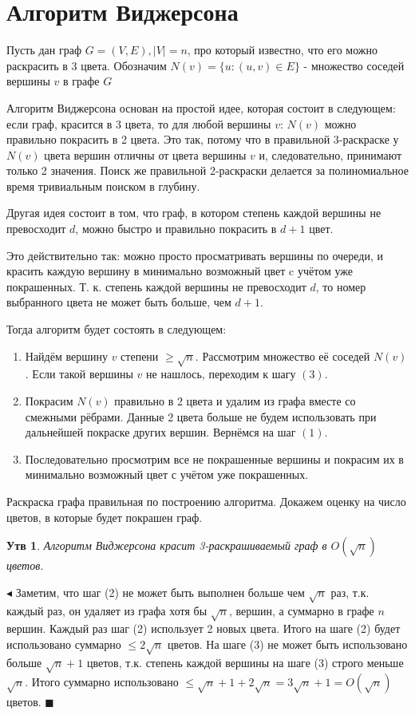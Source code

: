 \documentclass{article}
\newtheorem*{statement}{Утв}
\begin{document}
\section{Алгоритм Виджерсона}

Пусть дан граф $G=(V, E), |V| = n$,  про который известно, что его можно раскрасить в 3 цвета. Обозначим $N(v) = \{u: (u, v) \in E \} $ - множество соседей вершины $v$ в графе $G$

Алгоритм Виджерсона основан на простой идее, которая состоит в следующем: 
если граф, красится в 3 цвета, то для любой вершины $v$: $N(v)$ можно правильно покрасить в 2 цвета.
Это так, потому что в правильной 3-раскраске у $N(v)$ цвета вершин отличны от цвета вершины $v$ и, следовательно, принимают только 2 значения. Поиск же правильной 2-раскраски делается за полиномиальное время тривиальным поиском в глубину.

Другая идея состоит в том, что граф, в котором степень каждой вершины не превосходит $d$, можно быстро и правильно покрасить в $d + 1$ цвет.

Это действительно так: можно просто просматривать вершины по очереди, и красить каждую вершину в минимально возможный цвет c учётом уже покрашенных. Т. к. степень каждой вершины не превосходит $d$, то номер выбранного цвета не может быть больше, чем $d + 1$.

Тогда алгоритм будет состоять в следующем:
\begin{enumerate}
\item Найдём вершину $v$ степени $\ge \sqrt{n}$. Рассмотрим множество её соседей $N(v)$. Если такой вершины $v$ не нашлось, переходим к шагу $(3)$.
\item Покрасим $N(v)$ правильно в 2 цвета и удалим из графа вместе со смежными рёбрами. Данные 2 цвета больше не будем использовать при дальнейшей покраске других вершин. Вернёмся на шаг $(1)$.
\item Последовательно просмотрим все не покрашенные вершины и покрасим их в минимально возможный цвет с учётом уже покрашенных.
\end{enumerate}

Раскраска графа правильная по построению алгоритма. Докажем оценку на число цветов, в которые будет покрашен граф.
\begin{statement}
Алгоритм Виджерсона красит 3-раскрашиваемый граф в $O(\sqrt{n})$ цветов.
\end{statement}

$\blacktriangleleft$
Заметим, что шаг (2) не может быть выполнен больше чем $\sqrt{n}$ раз, т.к. каждый раз, он удаляет из графа хотя бы $\sqrt{n}$, вершин, а суммарно в графе $n$ вершин.
Каждый раз шаг (2) использует 2 новых цвета. Итого на шаге (2) будет использовано суммарно $\le 2\sqrt{n}$ цветов.
На шаге (3) не может быть использовано больше $\sqrt{n} + 1$ цветов, т.к. степень каждой вершины на шаге (3) строго меньше $\sqrt{n}$.
Итого суммарно использовано $\le \sqrt{n} + 1 + 2\sqrt{n} = 3\sqrt{n} + 1 = O(\sqrt{n})$ цветов.
$\blacksquare$
\end{document}
